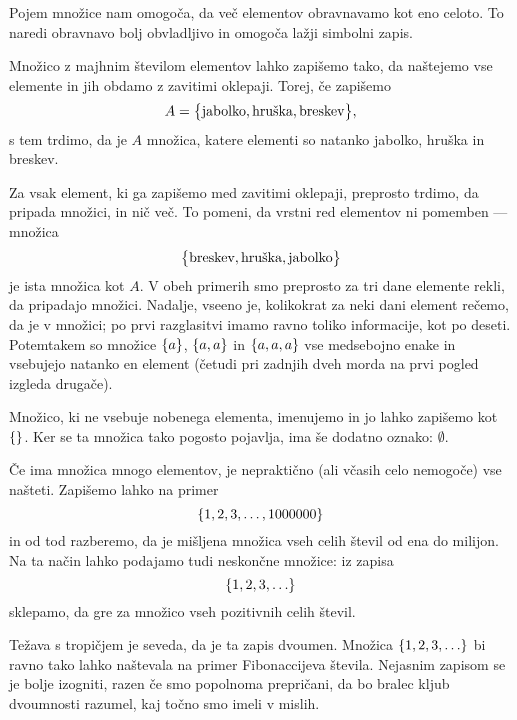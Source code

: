                 Pojem množice nam omogoča, da več elementov obravnavamo kot eno celoto. To naredi obravnavo bolj obvladljivo in omogoča lažji simbolni zapis.

                Množico z majhnim številom elementov lahko zapišemo tako, da naštejemo vse elemente in jih obdamo z zavitimi oklepaji. Torej, če zapišemo
                \[A = \set[1]{\text{jabolko}, \text{hruška}, \text{breskev}},\]
                s tem trdimo, da je $A$ množica, katere elementi so natanko jabolko, hruška in breskev.

                Za vsak element, ki ga zapišemo med zavitimi oklepaji, preprosto trdimo, da pripada množici, in nič več. To pomeni, da vrstni red elementov ni pomemben --- množica
                \[\set[1]{\text{breskev}, \text{hruška}, \text{jabolko}}\]
                je ista množica kot $A$. V obeh primerih smo preprosto za tri dane elemente rekli, da pripadajo množici. Nadalje, vseeno je, kolikokrat za neki dani element rečemo, da je v množici; po prvi razglasitvi imamo ravno toliko informacije, kot po deseti. Potemtakem so množice $\set{a}$, $\set{a, a}$ in $\set{a, a, a}$ vse medsebojno enake in vsebujejo natanko en element (četudi pri zadnjih dveh morda na prvi pogled izgleda drugače).

                Množico, ki ne vsebuje nobenega elementa, imenujemo  in jo lahko zapišemo kot $\set{}$. Ker se ta množica tako pogosto pojavlja, ima še dodatno oznako: $\emptyset$.

                Če ima množica mnogo elementov, je nepraktično (ali včasih celo nemogoče) vse našteti. Zapišemo lahko na primer
                \[\set{1, 2, 3, \ldots, 1000000}\]
                in od tod razberemo, da je mišljena množica vseh celih števil od ena do milijon. Na ta način lahko podajamo tudi neskončne množice: iz zapisa
                \[\set{1, 2, 3, \ldots}\]
                sklepamo, da gre za množico vseh pozitivnih celih števil.

                Težava s tropičjem je seveda, da je ta zapis dvoumen. Množica $\set{1, 2, 3, \ldots}$ bi ravno tako lahko naštevala na primer Fibonaccijeva števila. Nejasnim zapisom se je bolje izogniti, razen če smo popolnoma prepričani, da bo bralec kljub dvoumnosti razumel, kaj točno smo imeli v mislih.

